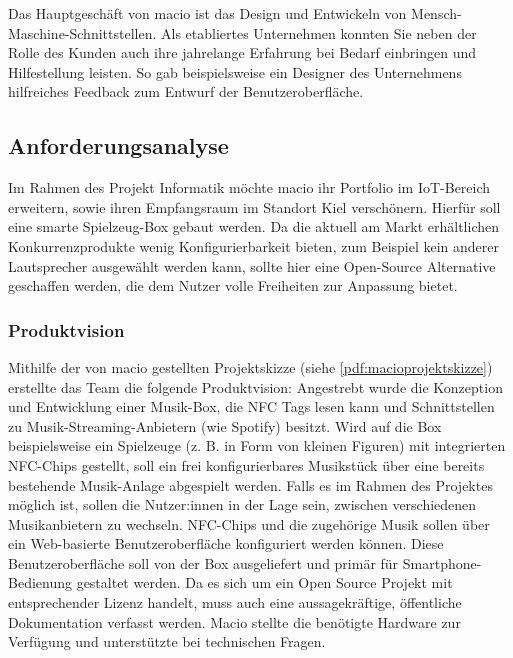 \documentclass[10pt, a4paper]{article}
\begin{document}
\begin{onehalfspace}
Das Hauptgeschäft von macio ist das Design und Entwickeln von Mensch-Maschine-Schnittstellen.
Als etabliertes Unternehmen konnten Sie neben der Rolle des Kunden auch ihre jahrelange Erfahrung bei Bedarf einbringen und Hilfestellung leisten.
So gab beispielsweise ein Designer des Unternehmens hilfreiches Feedback zum Entwurf der Benutzeroberfläche.
\subsection{Anforderungsanalyse}
Im Rahmen des Projekt Informatik möchte macio ihr Portfolio im IoT-Bereich erweitern, sowie ihren Empfangsraum im Standort Kiel verschönern.
Hierfür soll eine smarte Spielzeug-Box gebaut werden.
Da die aktuell am Markt erhältlichen Konkurrenzprodukte wenig Konfigurierbarkeit bieten, zum Beispiel kein anderer Lautsprecher ausgewählt werden kann, sollte hier eine Open-Source Alternative geschaffen werden, die dem Nutzer volle Freiheiten zur Anpassung bietet.
\subsubsection{Produktvision}
Mithilfe der von macio gestellten Projektskizze (siehe \autoref{pdf:macioprojektskizze}) erstellte das Team die folgende Produktvision:
Angestrebt wurde die Konzeption und Entwicklung einer Musik-Box, die NFC Tags lesen kann und Schnittstellen zu Musik-Streaming-Anbietern (wie Spotify) besitzt.
Wird auf die Box beispielsweise ein Spielzeuge (z. B. in Form von kleinen Figuren) mit integrierten NFC-Chips gestellt, soll ein frei konfigurierbares Musikstück über eine bereits bestehende Musik-Anlage abgespielt werden.
Falls es im Rahmen des Projektes möglich ist, sollen die Nutzer:innen in der Lage sein, zwischen verschiedenen Musik\-anbietern zu wechseln.
NFC-Chips und die zugehörige Musik sollen über ein Web-basierte Benutzeroberfläche konfiguriert werden können.
Diese Benutzeroberfläche soll von der Box ausgeliefert und primär für Smartphone-Bedienung gestaltet werden.
Da es sich um ein Open Source Projekt mit entsprechender Lizenz handelt, muss auch eine aussagekräftige, öffentliche Dokumentation verfasst werden.
Macio stellte die benötigte Hardware zur Verfügung und unterstützte bei technischen Fragen.\\


\end{onehalfspace}
\end{document}
